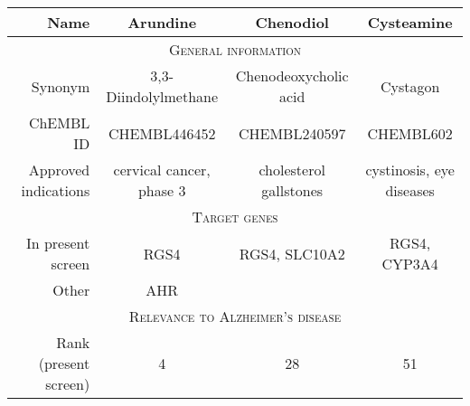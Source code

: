 \documentclass[letterpaper]{article}
\begin{document}
\begin{table}
\footnotesize
\begin{tabular}{r|c|c|c}
\toprule
                                              Name &                           Arundine &              Chenodiol &                          Cysteamine \\
\midrule
\multicolumn{4}{c}{\scshape General information} \\
\midrule
                                           Synonym &               3,3-Diindolylmethane &  Chenodeoxycholic acid &                            Cystagon \\
                                         ChEMBL ID &                       CHEMBL446452 &           CHEMBL240597 &                           CHEMBL602 \\
                              Approved indications &          cervical cancer, phase 3 & cholesterol gallstones &            cystinosis, eye diseases \\
\midrule
\multicolumn{4}{c}{\scshape Target genes} \\
\midrule
   In present screen &
   RGS4 &            RGS4, SLC10A2 &                         RGS4, CYP3A4 \\
                                             Other &                                AHR &                        &                                     \\
\midrule
\multicolumn{4}{c}{\scshape Relevance to Alzheimer's disease} \\
\midrule
                                             Rank (present screen)  &                                  4 &                     28 &                                  51 \\

\end{tabular}
\end{table}
\end{document}
